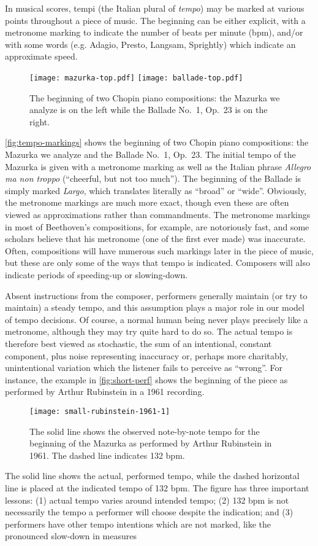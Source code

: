 \documentclass[12pt]{article}
\begin{document}
In musical scores, tempi (the Italian plural of {\em tempo}) may be
marked at various points throughout a piece of music. The
beginning can be either explicit, with a metronome marking to
indicate the number of beats per minute (bpm), and/or with some words
(e.g. Adagio, Presto, Langsam, Sprightly) which indicate an
approximate speed. 
\begin{figure}[t!]
  \centering
  \texttt{[image: mazurka-top.pdf]}
  \texttt{[image: ballade-top.pdf]}
  \caption{The beginning of two Chopin piano compositions: the Mazurka
    we analyze is on the left while the Ballade No.\ 1, Op.\ 23 is on
    the right.}
  \label{fig:tempo-markings}
\end{figure}
\autoref{fig:tempo-markings} shows the beginning of two Chopin piano
compositions: the Mazurka we analyze and the Ballade No.\ 1, Op.\ 23. The initial tempo of the Mazurka is given with a metronome
marking as well as the Italian phrase {\em Allegro ma non troppo}
(``cheerful, but not too much''). The beginning of the Ballade is simply
marked {\em Largo}, which translates literally as ``broad'' or
``wide''. Obviously, the metronome markings are much more exact,
though even these are often viewed as approximations rather than
commandments. The metronome markings in most of Beethoven's
compositions, for example, are notoriously fast, and some scholars
believe that his metronome (one of the first ever made) was
inaccurate. Often, compositions will have numerous such markings later
in the piece of music, but these are only some of the ways that tempo
is indicated. Composers will also indicate periods of speeding-up or
slowing-down.

Absent instructions from the composer, performers generally maintain
(or try to maintain) a steady tempo, and this assumption plays a major
role in our model of tempo decisions. Of course, a normal human being
never plays precisely like a 
metronome, although they may try quite hard to do so. The actual
tempo is therefore best viewed as stochastic, the sum of an
intentional, constant component, plus noise representing inaccuracy
or, perhaps more charitably, unintentional variation which the
listener fails to perceive as ``wrong''. For instance, the example in
\autoref{fig:short-perf} shows the beginning of the piece as performed
by Arthur Rubinstein in a 1961 recording. 
\begin{figure}[t!]
  \centering
  \texttt{[image: small-rubinstein-1961-1]}
  \caption{The solid line shows the observed note-by-note tempo for
    the beginning of the Mazurka as performed by Arthur Rubinstein in
    1961. The dashed line indicates 132 bpm.}
  \label{fig:short-perf}
\end{figure}
The solid line shows the
actual, performed tempo, while the dashed horizontal line is placed at
the indicated tempo of 132 bpm. The figure has three important
lessons: (1) actual tempo varies around intended tempo; (2) 132 bpm is
not necessarily the tempo a performer will choose despite the
indication; and (3) performers have other tempo intentions which are
not marked, like the pronounced slow-down in measures 
\end{document}
